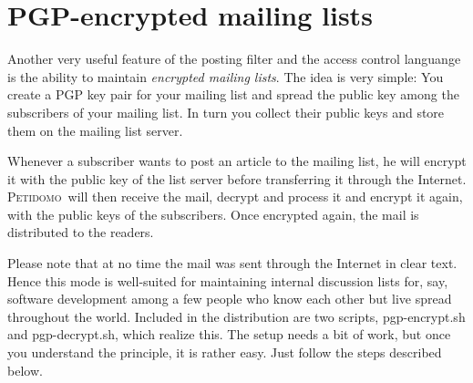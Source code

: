 \documentclass[a4paper,10pt]{scrreprt}
\newcommand{\Petidomo}{{\scshape Peti\-domo}}
\newcommand{\Def}[1]{{\sl #1}}
\newcommand{\file}[1]{{\sf #1}}
\begin{document}
\section{PGP-encrypted mailing lists}

Another very useful feature of the posting filter and the access
control languange is the ability to maintain \Def{encrypted mailing
lists}. The idea is very simple: You create a PGP key pair for your
mailing list and spread the public key among the subscribers of your
mailing list. In turn you collect their public keys and store them on
the mailing list server.

Whenever a subscriber wants to post an article to the mailing list, he
will encrypt it with the public key of the list server before
transferring it through the Internet. \Petidomo\ will then receive the
mail, decrypt and process it and encrypt it again, with the public
keys of the subscribers. Once encrypted again, the mail is distributed
to the readers.

Please note that at no time the mail was sent through the Internet in
clear text. Hence this mode is well-suited for maintaining internal
discussion lists for, say, software development among a few people who
know each other but live spread throughout the world. Included in the
distribution are two scripts, \file{pgp-encrypt.sh} and
\file{pgp-decrypt.sh}, which realize this. The setup needs a bit of
work, but once you understand the principle, it is rather easy. Just
follow the steps described below.
\end{document}
